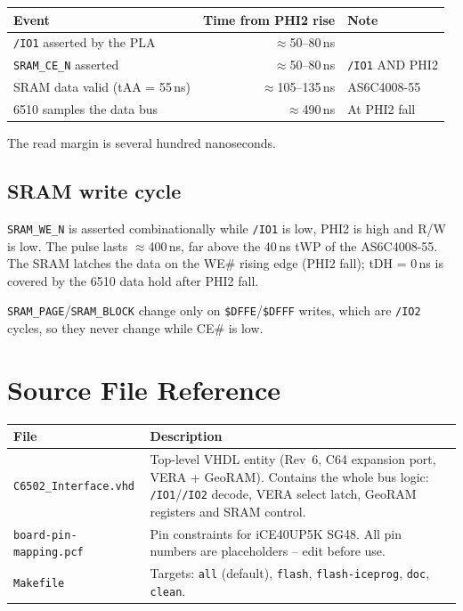 \documentclass[11pt,a4paper]{article}
\newcommand{\cmd}[1]{\texttt{#1}}
\newcommand{\sig}[1]{\texttt{#1}}
\newcommand{\file}[1]{\texttt{#1}}
\newcommand{\hex}[1]{\texttt{\$#1}}
\begin{document}
\begin{center}
\begin{tabular}{lrl}
\toprule
\textbf{Event} & \textbf{Time from PHI2 rise} & \textbf{Note} \\
\midrule
\sig{/IO1} asserted by the PLA & $\approx$50--80\,ns & \\
\sig{SRAM\_CE\_N} asserted     & $\approx$50--80\,ns & \sig{/IO1} AND PHI2 \\
SRAM data valid (tAA = 55\,ns) & $\approx$105--135\,ns & AS6C4008-55 \\
6510 samples the data bus      & $\approx$490\,ns & At PHI2 fall \\
\bottomrule
\end{tabular}
\end{center}

The read margin is several hundred nanoseconds.

\subsection{SRAM write cycle}

\sig{SRAM\_WE\_N} is asserted combinationally while \sig{/IO1} is low,
PHI2 is high and R/W is low.  The pulse lasts $\approx$400\,ns, far above
the 40\,ns tWP of the AS6C4008-55.  The SRAM latches the data on the WE\#
rising edge (PHI2 fall); tDH = 0\,ns is covered by the 6510 data hold
after PHI2 fall.

\sig{SRAM\_PAGE}/\sig{SRAM\_BLOCK} change only on \hex{DFFE}/\hex{DFFF}
writes, which are \sig{/IO2} cycles, so they never change while CE\# is
low.

\section{Source File Reference}

\begin{center}
\begin{tabular}{lp{9cm}}
\toprule
\textbf{File} & \textbf{Description} \\
\midrule
\file{C6502\_Interface.vhd} &
    Top-level VHDL entity (Rev~6, C64 expansion port, VERA + GeoRAM).
    Contains the whole bus logic: \sig{/IO1}/\sig{/IO2} decode, VERA
    select latch, GeoRAM registers and SRAM control. \\
\file{board-pin-mapping.pcf} &
    Pin constraints for iCE40UP5K SG48.
    All pin numbers are placeholders -- edit before use. \\
\file{Makefile} &
    Targets: \cmd{all} (default), \cmd{flash}, \cmd{flash-iceprog},
    \cmd{doc}, \cmd{clean}. \\
\bottomrule
\end{tabular}
\end{center}
\end{document}
